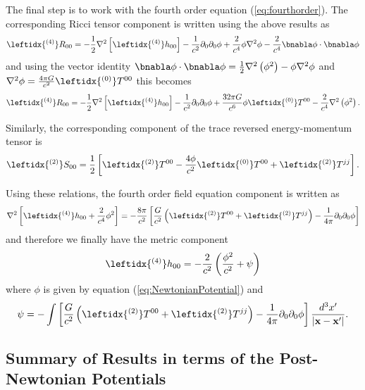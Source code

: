 The final step is to work with the fourth order equation (\ref{eq:fourthorder}). The corresponding Ricci tensor component is written using the above results as 
\begin{equation}
\leftidx{ ^{(4)}}R_{00} = - \frac{1}{2} \nabla^2 \left[ \leftidx{ ^{(4)}} h_{00} \right] - \frac{1}{c^2} \partial_0 \partial_0 \phi + \frac{2}{c^4} \phi \nabla^2 \phi - \frac{2}{c^4} \bnabla \phi \cdot \bnabla \phi 
\end{equation}
and using the vector identity $\bnabla \phi \cdot \bnabla \phi = \frac{1}{2} \nabla^2 \left( \phi^2 \right) - \phi \nabla^2 \phi$ and $\nabla^2 \phi = \frac{4\pi G}{c^2} \leftidx{^{(0)}} T^{00}$ this becomes
\begin{equation}
\leftidx{ ^{(4)}}R_{00} = - \frac{1}{2} \nabla^2 \left[ \leftidx{ ^{(4)}} h_{00} \right] - \frac{1}{c^2} \partial_0 \partial_0 \phi + \frac{32\pi G}{c^6} \phi  \leftidx{^{(0)}} T^{00} - \frac{2}{c^4}\nabla^2 \left( \phi^2 \right).
\end{equation}

Similarly, the corresponding component of the trace reversed energy-momentum tensor is
\begin{equation}
\leftidx{ ^{(2)}} S_{00}  = \frac{1}{2} \left[ \leftidx{ ^{(2)}} T^{00} - \frac{4\phi }{c^2} \leftidx{ ^{(0)}} T^{00} + \leftidx{ ^{(2)}} T^{jj} \right].
\end{equation}

Using these relations, the fourth order field equation component is written as
\begin{equation}
 \nabla^2 \left[ \leftidx{ ^{(4)}} h_{00} + \frac{2}{c^4} \phi^2  \right] = - \frac{8\pi }{c^2} \left[ \frac{G}{c^2} \left( \leftidx{ ^{(2)}} T^{00}  + \leftidx{ ^{(2)}} T^{jj} \right) - \frac{1}{4\pi} \partial_0 \partial_0 \phi \right]  
\end{equation}
and therefore we finally have the metric component
\begin{equation}
\leftidx{ ^{(4)}} h_{00}  = -\frac{2}{c^2} \left(\frac{\phi^2}{c^2} + \psi \right)
\end{equation}
where $\phi$ is given by equation (\ref{eq:NewtonianPotential}) and
\begin{equation}
\psi = -\int \left[ \frac{G}{c^2} \left( \leftidx{ ^{(2)}} T^{00}  + \leftidx{ ^{(2)}} T^{jj} \right) - \frac{1}{4\pi} \partial_0 \partial_0 \phi \right] \frac{d^3 x'}{\left| \textbf{x} - \textbf{x}'\right|}.
\end{equation}

\subsection{Summary of Results in terms of the Post-Newtonian Potentials}

